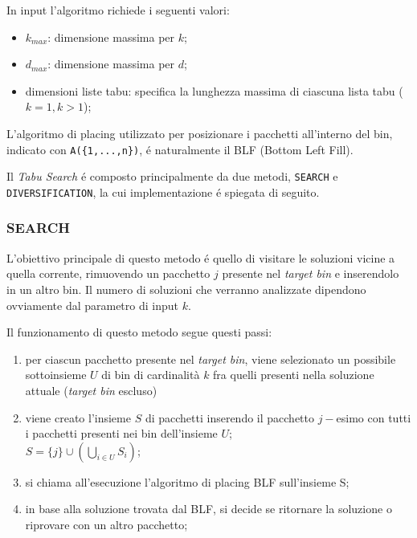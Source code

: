 In input l'algoritmo richiede i seguenti valori:
\begin{itemize}[noitemsep]
\item $k_{max}$: dimensione massima per $k$;
\item $d_{max}$: dimensione massima per $d$;
\item dimensioni liste tabu: specifica la lunghezza massima di ciascuna lista tabu ($k=1, k>1$);
\end{itemize}

L'algoritmo di placing utilizzato per posizionare i pacchetti all'interno del bin, indicato con \texttt{A(\{1,...,n\})}, é naturalmente il BLF (Bottom Left Fill).

Il \textit{Tabu Search} é composto principalmente da due metodi, \texttt{SEARCH} e \texttt{DIVERSIFICATION}, la cui implementazione é spiegata di seguito.

\subsubsection{SEARCH}
L'obiettivo principale di questo metodo é quello di visitare le soluzioni vicine a quella corrente, rimuovendo un pacchetto $j$ presente nel \textit{target bin} e inserendolo in un altro bin. Il numero di soluzioni che verranno analizzate dipendono ovviamente dal parametro di input $k$.

Il funzionamento di questo metodo segue questi passi:
\begin{enumerate}[noitemsep]
   \item per ciascun pacchetto presente nel \textit{target bin}, viene selezionato un possibile sottoinsieme $U$ di bin di cardinalità $k$ fra quelli presenti nella soluzione attuale (\textit{target bin} escluso)
   \item viene creato l'insieme $S$ di pacchetti inserendo il pacchetto $j-$esimo con tutti i pacchetti presenti nei bin dell'insieme $U$;\\$S = \{j\} \cup (\bigcup_{i\in U}S_i)$;
   \item si chiama all'esecuzione l'algoritmo di placing BLF sull'insieme S;
   \item in base alla soluzione trovata dal BLF, si decide se ritornare la soluzione o riprovare con un altro pacchetto;
\end{enumerate}

